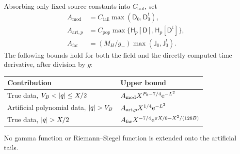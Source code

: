 Absorbing only fixed source constants into \(C_{\mathrm{tail}}\), set
\begin{subequations}\label{eq:tail-constants}
\begin{align}
 A_{\mathrm{mod}}&=C_{\mathrm{tail}}
                 \max(\mathsf D_0,\mathsf D_0^t),\\
 A_{\mathrm{art},p}&=C_{\mathrm{pop}}
       \max\{\mathsf H_p[\mathsf D],\mathsf H_p[\mathsf D^t]\},\\
 A_{\mathrm{far}}&=(M_H/g_-)\max(\mathsf J_0,\mathsf J_0^t).
\end{align}
\end{subequations}
The following bounds hold for both the field and the directly
computed time derivative, after division by \(g\):
\begin{center}
\begin{tabular}{@{}ll@{}}
\toprule
Contribution & Upper bound\\
\midrule
True data, \(V_B<\lvert q\rvert\le X/2\) &
\(A_{\mathrm{mod}}X^{P_0-7/4}\mathrm e^{-L^2}\)\\
Artificial polynomial data, \(\lvert q\rvert>V_B\) &
\(A_{\mathrm{art},p}X^{1/4}\mathrm e^{-L^2}\)\\
True data, \(\lvert q\rvert>X/2\) &
\(A_{\mathrm{far}}X^{-7/4}\mathrm e^{\pi X/8-X^2/(128B)}\)\\
\bottomrule
\end{tabular}
\end{center}
No gamma function or Riemann--Siegel function is extended onto
the artificial tails.

